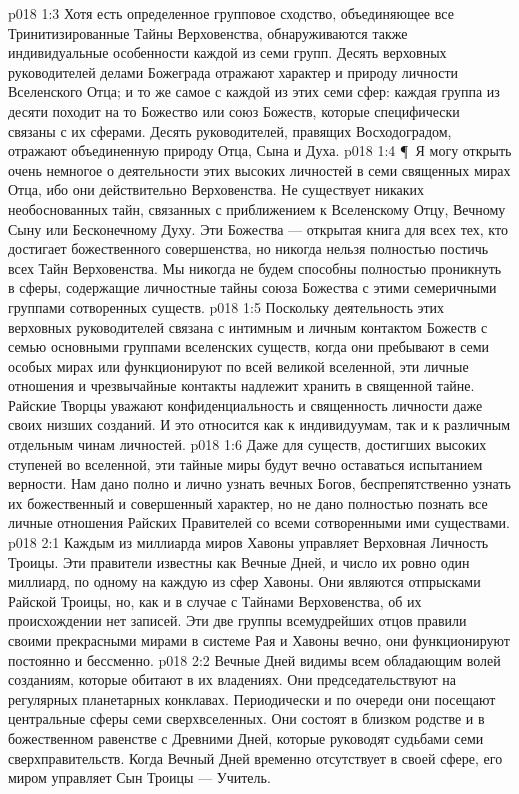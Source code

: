 \vs p018 1:3 Хотя есть определенное групповое сходство, объединяющее все Тринитизированные Тайны Верховенства, обнаруживаются также индивидуальные особенности каждой из семи групп. Десять верховных руководителей делами Божеграда отражают характер и природу личности Вселенского Отца; и то же самое с каждой из этих семи сфер: каждая группа из десяти походит на то Божество или союз Божеств, которые специфически связаны с их сферами. Десять руководителей, правящих Восходоградом, отражают объединенную природу Отца, Сына и Духа.
\vs p018 1:4 \P\ Я могу открыть очень немногое о деятельности этих высоких личностей в семи священных мирах Отца, ибо они действительно  Верховенства. Не существует никаких необоснованных тайн, связанных с приближением к Вселенскому Отцу, Вечному Сыну или Бесконечному Духу. Эти Божества --- открытая книга для всех тех, кто достигает божественного совершенства, но никогда нельзя полностью постичь всех Тайн Верховенства. Мы никогда не будем способны полностью проникнуть в сферы, содержащие личностные тайны союза Божества с этими семеричными группами сотворенных существ.
\vs p018 1:5 Поскольку деятельность этих верховных руководителей связана с интимным и личным контактом Божеств с семью основными группами вселенских существ, когда они пребывают в семи особых мирах или функционируют по всей великой вселенной, эти личные отношения и чрезвычайные контакты надлежит хранить в священной тайне. Райские Творцы уважают конфиденциальность и священность личности даже своих низших созданий. И это относится как к индивидуумам, так и к различным отдельным чинам личностей.
\vs p018 1:6 Даже для существ, достигших высоких ступеней во вселенной, эти тайные миры будут вечно оставаться испытанием верности. Нам дано полно и лично узнать вечных Богов, беспрепятственно узнать их божественный и совершенный характер, но не дано полностью познать все личные отношения Райских Правителей со всеми сотворенными ими существами.
\vs p018 2:1 Каждым из миллиарда миров Хавоны управляет Верховная Личность Троицы. Эти правители известны как Вечные Дней, и число их ровно один миллиард, по одному на каждую из сфер Хавоны. Они являются отпрысками Райской Троицы, но, как и в случае с Тайнами Верховенства, об их происхождении нет записей. Эти две группы всемудрейших отцов правили своими прекрасными мирами в системе Рая и Хавоны вечно, они функционируют постоянно и бессменно.
\vs p018 2:2 Вечные Дней видимы всем обладающим волей созданиям, которые обитают в их владениях. Они председательствуют на регулярных планетарных конклавах. Периодически и по очереди они посещают центральные сферы семи сверхвселенных. Они состоят в близком родстве и в божественном равенстве с Древними Дней, которые руководят судьбами семи сверхправительств. Когда Вечный Дней временно отсутствует в своей сфере, его миром управляет Сын Троицы --- Учитель.

